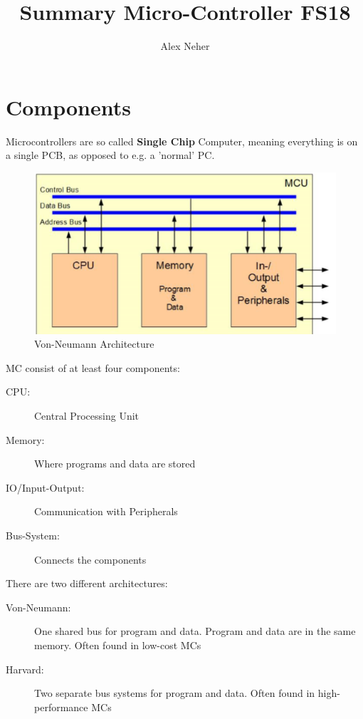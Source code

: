 \documentclass[a4paper, 11pt, nofootinbib]{article}
\begin{document}
\title{Summary Micro-Controller FS18}
\author{Alex Neher}
\maketitle

\tableofcontents
\newpage

\graphicspath{{./Pictures/}}

\section{Components}
Microcontrollers are so called \textbf{Single Chip} Computer, meaning everything is on a single PCB, as opposed to e.g. a 'normal' PC.

\begin{figure}
	\centering
	\includegraphics[keepaspectratio=true,height=10\baselineskip]{architecture.PNG}
	\caption{Von-Neumann Architecture}
	\label{fig:arch}
\end{figure}

MC consist of at least four components:

\begin{description}
	\item[CPU: ] Central Processing Unit
	\item[Memory: ] Where programs and data are stored
	\item[IO/Input-Output: ] Communication with Peripherals
	\item[Bus-System: ] Connects the components
\end{description}

\vspace{10px}

\noindent There are two different architectures:

\begin{description}
	\item[Von-Neumann: ] One shared bus for program and data. Program and data are in the same memory. Often found in low-cost MCs
	\item[Harvard: ] Two separate bus systems for program and data. Often found in high-performance MCs
\end{description}
\vspace{10px}
\end{document}
